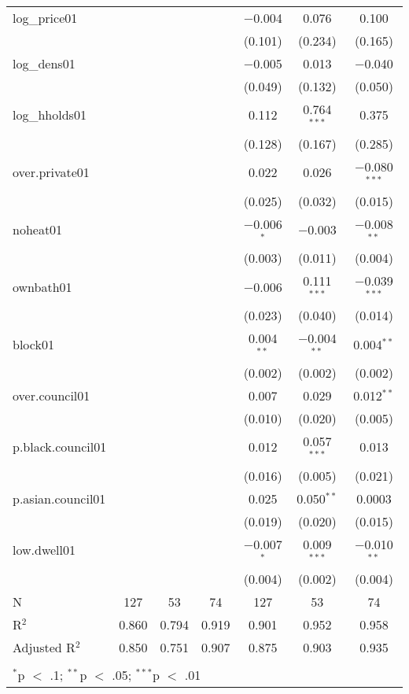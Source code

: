 \begin{table}[!htbp]
\begin{tabular}{@{\extracolsep{5pt}}lcccccc}
  log\_price01 &  &  &  & $-$0.004 & 0.076 & 0.100 \\ 
  &  &  &  & (0.101) & (0.234) & (0.165) \\ 
  log\_dens01 &  &  &  & $-$0.005 & 0.013 & $-$0.040 \\ 
  &  &  &  & (0.049) & (0.132) & (0.050) \\ 
  log\_hholds01 &  &  &  & 0.112 & 0.764$^{***}$ & 0.375 \\ 
  &  &  &  & (0.128) & (0.167) & (0.285) \\ 
  over.private01 &  &  &  & 0.022 & 0.026 & $-$0.080$^{***}$ \\ 
  &  &  &  & (0.025) & (0.032) & (0.015) \\ 
  noheat01 &  &  &  & $-$0.006$^{*}$ & $-$0.003 & $-$0.008$^{**}$ \\ 
  &  &  &  & (0.003) & (0.011) & (0.004) \\ 
  ownbath01 &  &  &  & $-$0.006 & 0.111$^{***}$ & $-$0.039$^{***}$ \\ 
  &  &  &  & (0.023) & (0.040) & (0.014) \\ 
  block01 &  &  &  & 0.004$^{**}$ & $-$0.004$^{**}$ & 0.004$^{**}$ \\ 
  &  &  &  & (0.002) & (0.002) & (0.002) \\ 
  over.council01 &  &  &  & 0.007 & 0.029 & 0.012$^{**}$ \\ 
  &  &  &  & (0.010) & (0.020) & (0.005) \\ 
  p.black.council01 &  &  &  & 0.012 & 0.057$^{***}$ & 0.013 \\ 
  &  &  &  & (0.016) & (0.005) & (0.021) \\ 
  p.asian.council01 &  &  &  & 0.025 & 0.050$^{**}$ & 0.0003 \\ 
  &  &  &  & (0.019) & (0.020) & (0.015) \\ 
  low.dwell01 &  &  &  & $-$0.007$^{*}$ & 0.009$^{***}$ & $-$0.010$^{**}$ \\ 
  &  &  &  & (0.004) & (0.002) & (0.004) \\ 
 N & 127 & 53 & 74 & 127 & 53 & 74 \\ 
R$^{2}$ & 0.860 & 0.794 & 0.919 & 0.901 & 0.952 & 0.958 \\ 
Adjusted R$^{2}$ & 0.850 & 0.751 & 0.907 & 0.875 & 0.903 & 0.935 \\ 
\hline \\[-1.8ex] 
\multicolumn{7}{l}{$^{*}$p $<$ .1; $^{**}$p $<$ .05; $^{***}$p $<$ .01} \\ 
\end{tabular} 
\end{table} 
